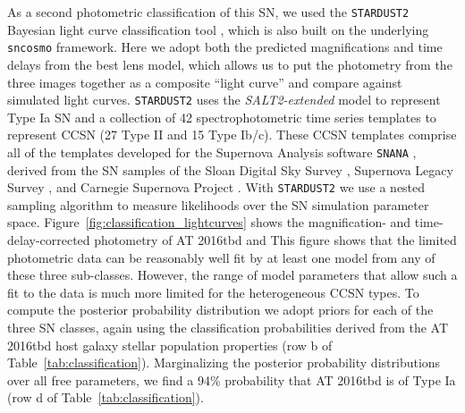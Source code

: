 \documentclass[12pt]{article}
\def\SNABC{AT 2016tbd\xspace}
\begin{document}
As a second photometric classification of this SN, we used the {\tt STARDUST2} Bayesian light curve classification tool \cite{rodney_type_2014}, which is also built on the underlying {\tt sncosmo} framework. Here we adopt both the predicted magnifications and time delays from the best lens model, which allows us to put the photometry from the three images together as a composite ``light curve'' and compare against simulated light curves.  {\tt STARDUST2} uses the {\it SALT2-extended} model to represent Type Ia SN \cite{guy_salt2:_2007, pierel_extending_2018} and a collection of 42  spectrophotometric time series templates to represent CCSN (27 Type II and 15 Type Ib/c).  These CCSN templates comprise all of the templates developed for the Supernova Analysis software {\tt SNANA} \cite{kessler_snana:_2009}, derived from the SN samples of the Sloan Digital Sky Survey \cite{frieman_sloan_2008,sako_sloan_2008, dandrea_type_2010}, Supernova Legacy Survey \cite{astier_supernova_2006}, and Carnegie Supernova Project \cite{hamuy_carnegie_2006, stritzinger_he-rich_2009, morrell_carnegie_2012}.  With {\tt STARDUST2} we use a nested sampling algorithm to measure likelihoods over the SN simulation parameter space.  
Figure~\ref{fig:classification_lightcurves} shows the magnification- and time-delay-corrected photometry of \SNABC and 
This figure shows that the limited photometric data can be reasonably well fit by at least one model from any of these three sub-classes. 
 However, the range of model parameters that allow such a fit to the data is much more limited for the heterogeneous CCSN types. 
To compute the posterior probability distribution we adopt priors for each of the three SN classes, again using the classification probabilities derived from the \SNABC host galaxy stellar population properties (row b of Table~\ref{tab:classification}). 
Marginalizing the posterior  probability distributions over all free parameters, we find a 94\% probability that \SNABC is of Type Ia (row d of Table~\ref{tab:classification}).  
\end{document}
